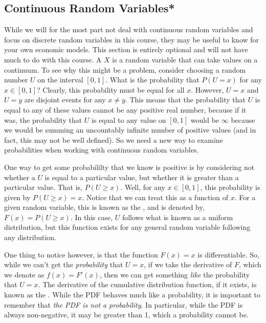 \subsection*{Continuous Random Variables*}
While we will for the most part not deal with continuous random variables and focus on discrete random variables in this course, they may be useful to know for your own economic models. This section is entirely optional and will not have much to do with this course. A  $X$ is a random variable that can take values on a continuum. To see why this might be a problem, consider choosing a random number $U$ on the interval $[0, 1]$. What is the probability that $P(U = x)$ for any $x \in [0, 1]$? Clearly, this probability must be equal for all $x$. However, $U = x$ and $U = y$ are disjoint events for any $x \neq y$. This means that the probability that $U$ is equal to any of these values cannot be any positive real number, because if it was, the probability that $U$ is equal to any value on $[0, 1]$ would be $\infty$ because we would be summing an uncountably infinite number of positive values (and in fact, this may not be well defined). So we need a new way to examine probabilities when working with continuous random variables.

One way to get some probabililty that we know is positive is by considering not whether a $U$ is equal to a particular value, but whether it is greater than a particular value. That is, $P(U \geq x)$. Well, for any $x \in [0, 1]$, this probability is given by $P(U \geq x) = x$. Notice that we can treat this as a function of $x$. For a given random variable, this is known as the , and is denoted by, $F(x) = P(U \geq x)$. In this case, $U$ follows what is known as a uniform distribution, but this function exists for any general random variable following any distribution. 

One thing to notice however, is that the function $F(x) = x$ is differentiable. So, while we can't get the \emph{probability} that $U = x$, if we take the derivative of $F$, which we denote as $f(x) = F'(x)$, then we can get something \emph{like} the probability that $U = x$. The derivative of the cumulative distribution function, if it exists, is known as the . While the PDF behaves much like a probability, it is important to remember that \emph{the PDF is not a probability}. In particular, while the PDF is always non-negative, it may be greater than 1, which a probability cannot be. 

